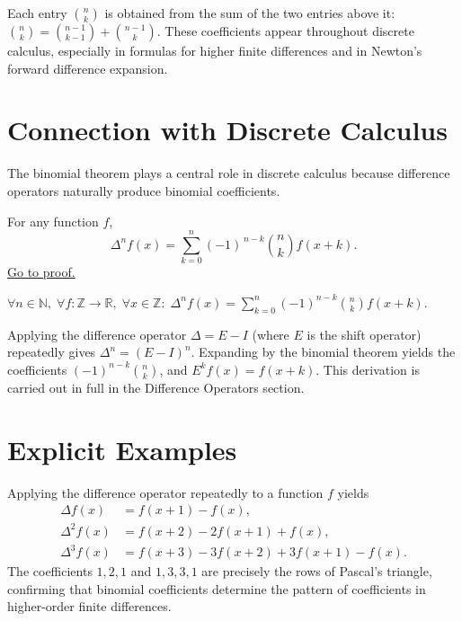 \begin{remark*}
Each entry \(\binom{n}{k}\) is obtained from the sum of the two entries
above it: \(\binom{n}{k}=\binom{n-1}{k-1}+\binom{n-1}{k}\).
These coefficients appear throughout discrete calculus, especially in
formulas for higher finite differences and in Newton's forward difference
expansion.
\end{remark*}

\section*{Connection with Discrete Calculus}

The binomial theorem plays a central role in discrete calculus because
difference operators naturally produce binomial coefficients.

\begin{proposition}
\label{prop:higher-diff-formula}
For any function \(f\),
\[
\Delta^n f(x)
=
\sum_{k=0}^{n} (-1)^{\,n-k}
\binom{n}{k}
f(x+k).
\]
\hyperref[prf:higher-diff-formula]{Go to proof.}
\end{proposition}

\begin{remark*}
\(\forall n \in \mathbb{N},\; \forall f : \mathbb{Z}\to\mathbb{R},\; \forall x \in \mathbb{Z}:\;
\Delta^n f(x) = \displaystyle\sum_{k=0}^{n}(-1)^{n-k}\binom{n}{k}f(x+k)\).
\end{remark*}

\begin{remark*}
Applying the difference operator \(\Delta = E - I\) (where \(E\) is the shift
operator) repeatedly gives \(\Delta^n = (E-I)^n\). Expanding by the binomial
theorem yields the coefficients \((-1)^{n-k}\binom{n}{k}\), and \(E^k f(x) = f(x+k)\).
This derivation is carried out in full in the Difference Operators section.
\end{remark*}

\section*{Explicit Examples}

Applying the difference operator repeatedly to a function \(f\) yields
\[
\begin{aligned}
\Delta f(x) &= f(x+1)-f(x), \\
\Delta^2 f(x) &= f(x+2)-2f(x+1)+f(x), \\
\Delta^3 f(x) &= f(x+3)-3f(x+2)+3f(x+1)-f(x).
\end{aligned}
\]
The coefficients \(1, 2, 1\) and \(1, 3, 3, 1\) are precisely the rows of
Pascal's triangle, confirming that binomial coefficients determine the pattern
of coefficients in higher-order finite differences.

